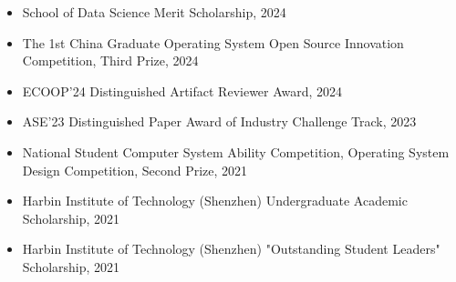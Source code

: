 \documentclass{academcv}
\begin{document}
\begin{itemize}
  \item School of Data Science Merit Scholarship, 2024
  \item The 1st China Graduate Operating System Open Source Innovation Competition, Third Prize, 2024
  \item ECOOP'24 Distinguished Artifact Reviewer Award, 2024
  \item ASE'23 Distinguished Paper Award of Industry Challenge Track, 2023
  \item National Student Computer System Ability Competition, Operating System Design Competition, Second Prize, 2021
  \item Harbin Institute of Technology (Shenzhen) Undergraduate Academic Scholarship, 2021
  \item Harbin Institute of Technology (Shenzhen) "Outstanding Student Leaders" Scholarship, 2021
\end{itemize}



\end{document}

